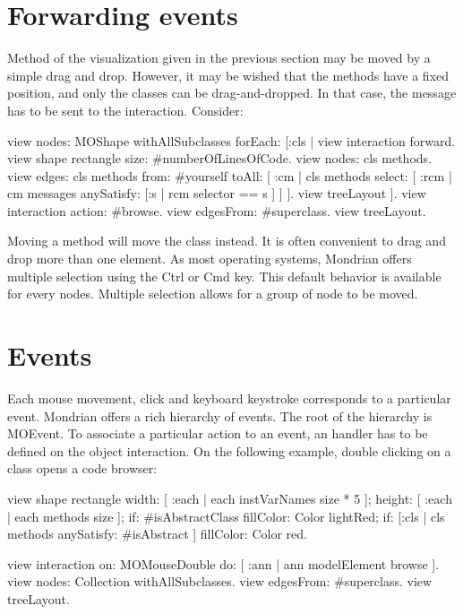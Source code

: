 \documentclass[a4paper,10pt,twoside]{book}
\begin{document}
\section{Forwarding events}

Method of the visualization given in the previous section may be moved by a simple drag and drop. However, it may be wished that the methods have a fixed position, and only the classes can be drag-and-dropped. In that case, the message  has to be sent to the interaction. Consider:

\begin{code}{}
view nodes: MOShape withAllSubclasses forEach: [:cls |
	view interaction forward.
	view shape rectangle 
					size: #numberOfLinesOfCode.
	view nodes: cls methods.
	view edges: cls methods from: #yourself toAll: [ :cm | cls methods select: [ :rcm |  cm messages anySatisfy: [:s | rcm selector == s ] ] ].
	view treeLayout
].
view interaction action: #browse.
view edgesFrom: #superclass.
view treeLayout.
\end{code}

Moving a method will move the class instead. It is often convenient to drag and drop more than one element. As most operating systems, Mondrian offers multiple selection using the Ctrl or Cmd key. This default behavior is available for every nodes. Multiple selection allows for a group of node to be moved.


\section{Events}

Each mouse movement, click and keyboard keystroke corresponds to a particular event. Mondrian offers a rich hierarchy of events. The root of the hierarchy is MOEvent. To associate a particular action to an event, an handler has to be defined on the object interaction. On the following example, double clicking on a class opens a code browser:

\begin{code}{}
view shape rectangle
  width: [ :each | each instVarNames size * 5 ];
  height: [ :each | each methods size ];
  if: #isAbstractClass fillColor: Color lightRed;
  if: [:cls | cls methods anySatisfy: #isAbstract ] fillColor: Color red.
  
view interaction on: MOMouseDouble do: [ :ann | 
  ann modelElement browse
].
view nodes: Collection withAllSubclasses.
view edgesFrom: #superclass.
view treeLayout.
\end{code}
\end{document}
